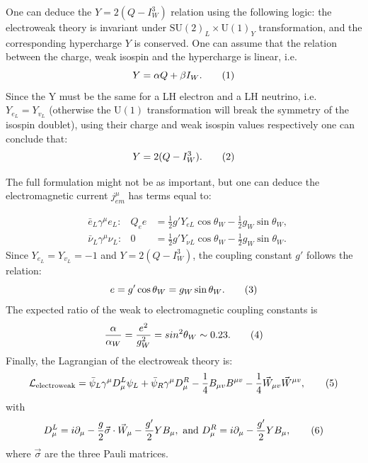 One can deduce the $Y = 2 (Q- I^{3}_W)$ relation using the following logic:
the electroweak theory is invariant under $\text{SU}(2)_L\times \text{U}(1)_Y $ transformation, 
and the corresponding hypercharge $Y$ is conserved.
One can assume that the relation between the charge, 
weak isospin and the hypercharge is linear, i.e.\  \[  Y = \alpha Q + \beta I_W. \addtag \] 
Since the Y must be the same for a LH electron and a LH neutrino, 
i.e. \ $Y_{e_L} = Y_{v_L}$ (otherwise the $\text{U}(1)$ transformation 
will break the symmetry of the isospin doublet), 
using their charge and weak isospin values respectively one can conclude that: \[ Y = 2 (Q- I^{3}_W). \addtag \]  

The full formulation might not be as important, but one can deduce the 
electromagnetic current $j^\mu_{em}$ has terms equal to:


\begin{align*}
    &\bar{e}_L\gamma^\mu e_L:       &Q_e e &= \frac{1}{2}g'Y_{eL}\cos\theta_W - \frac{1}{2}g_W \sin\theta_W, 
    \\
    &\bar{\nu}_L\gamma^\mu \nu_L:   &0 &= \frac{1}{2}g'Y_{\nu L}\cos\theta_W - \frac{1}{2}g_W \sin\theta_W.
\end{align*}
Since $Y_{e_L} = Y_{v_L} = -1$ and $ Y = 2 (Q- I^{3}_W)$, 
the coupling constant $g'$ follows the relation: 
\[e = g' \cos\theta_W = g_W\sin\theta_W. \addtag \]
The expected ratio of the weak to electromagnetic coupling constants is 
\[ \frac{\alpha}{\alpha_W} = \frac{e^2}{g_W^2} =  sin^2\theta_W \sim 0.23 .\addtag \]
Finally, the Lagrangian of the electroweak theory is:
\[
    \mathcal{L}_\text{electroweak}  =  \bar{\psi}_L\gamma^\mu D^L_\mu \psi_L 
    + \bar{\psi}_R \gamma^\mu D^R_\mu 
    -\frac{1}{4} B_{\mu v}B^{\mu v} 
    -\frac{1}{4} \vec{W}_{\mu v} \vec{W}^{\mu v},
    \addtag \]
with 
\[
D^L_\mu = i\partial_\mu - \frac{g}{2}  \vec{\sigma}\cdot \vec{W}_\mu - \frac{g'}{2} Y B_\mu,
\ \text{and}\  D^R_\mu = i\partial_\mu - \frac{g'}{2} YB_\mu,
\addtag \]
where $\vec{\sigma}$ are the three Pauli matrices. 


